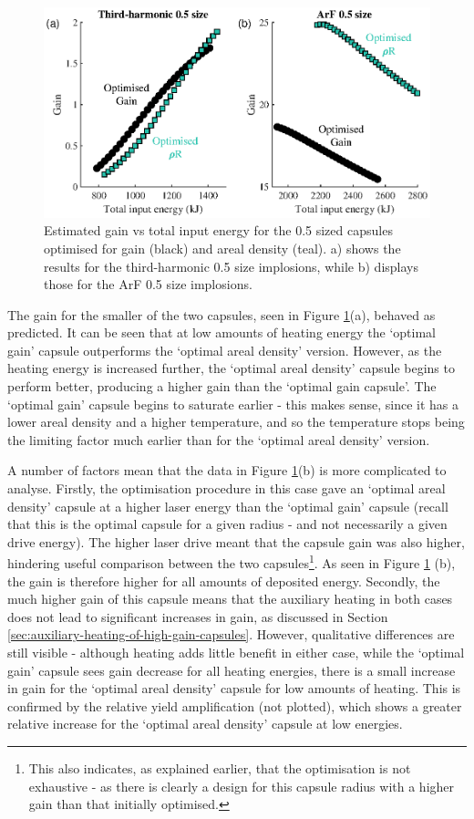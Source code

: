 \begin{figure}[ht]
\centering
\includegraphics{figures/FurtherSims/OptimisedRhoR.eps}
\caption{Estimated gain vs total input energy for the 0.5 sized capsules optimised for gain (black) and areal density (teal). a) shows the results for the third-harmonic 0.5 size implosions, while b) displays those for the ArF 0.5 size implosions.}
\label{fig:OptimisedRhoR}
\end{figure}

The gain for the smaller of the two capsules, seen in Figure \ref{fig:OptimisedRhoR}(a), behaved as predicted. It can be seen that at low amounts of heating energy the `optimal gain' capsule outperforms the `optimal areal density' version. However, as the heating energy is increased further, the `optimal areal density' capsule begins to perform better, producing a higher gain than the `optimal gain capsule'. The `optimal gain' capsule begins to saturate earlier - this makes sense, since it has a lower areal density and a higher temperature, and so the temperature stops being the limiting factor much earlier than for the `optimal areal density' version.

A number of factors mean that the data in Figure \ref{fig:OptimisedRhoR}(b) is more complicated to analyse. Firstly, the optimisation procedure in this case gave an `optimal areal density' capsule at a higher laser energy than the `optimal gain' capsule (recall that this is the optimal capsule for a given radius - and not necessarily a given drive energy). The higher laser drive meant that the capsule gain was also higher, hindering useful comparison between the two capsules\footnote{This also indicates, as explained earlier, that the optimisation is not exhaustive - as there is clearly a design for this capsule radius with a higher gain than that initially optimised.}. As seen in Figure \ref{fig:OptimisedRhoR} (b), the gain is therefore higher for all amounts of deposited energy. Secondly, the much higher gain of this capsule means that the auxiliary heating in both cases does not lead to significant increases in gain, as discussed in Section \ref{sec:auxiliary-heating-of-high-gain-capsules}. However, qualitative differences are still visible - although heating adds little benefit in either case, while the `optimal gain' capsule sees gain decrease for all heating energies, there is a small increase in gain for the `optimal areal density' capsule for low amounts of heating. This is confirmed by the relative yield amplification (not plotted), which shows a greater relative increase for the `optimal areal density' capsule at low energies.

